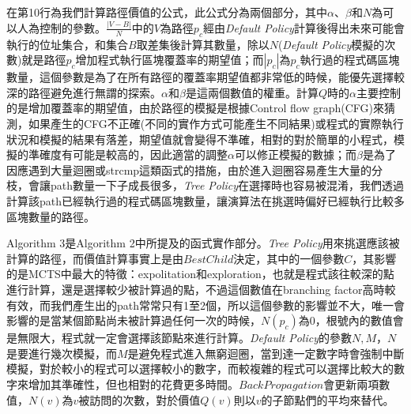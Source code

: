 \documentclass[12pt,a4paper,oneside]{book}
\begin{document}
在第10行為我們計算路徑價值的公式，此公式分為兩個部分，其中$\alpha$、$\beta$和$N$為可以人為控制的參數。$\frac{|V-B|}{N}$中的$V$為路徑$p_c$經由\textit{Default Policy}計算後得出未來可能會執行的位址集合，和集合$B$取差集後計算其數量，除以$N$(\textit{Default Policy}模擬的次數)就是路徑$p_c$增加程式執行區塊覆蓋率的期望值；而$|p_c|$為$p_c$執行過的程式碼區塊數量，這個參數是為了在所有路徑的覆蓋率期望值都非常低的時候，能優先選擇較深的路徑避免進行無謂的探索。$\alpha$和$\beta$是這兩個數值的權重。計算$Q$時的$\alpha$主要控制的是增加覆蓋率的期望值，由於路徑的模擬是根據Control flow graph(CFG)來猜測，如果產生的CFG不正確(不同的實作方式可能產生不同結果)或程式的實際執行狀況和模擬的結果有落差，期望值就會變得不準確，相對的對於簡單的小程式，模擬的準確度有可能是較高的，因此適當的調整$\alpha$可以修正模擬的數據；而$\beta$是為了因應遇到大量迴圈或strcmp這類函式的措施，由於進入迴圈容易產生大量的分枝，會讓path數量一下子成長很多，\textit{Tree Policy}在選擇時也容易被混淆，我們透過計算該path已經執行過的程式碼區塊數量，讓演算法在挑選時偏好已經執行比較多區塊數量的路徑。

Algorithm 3是Algorithm 2中所提及的函式實作部分。\textit{Tree Policy}用來挑選應該被計算的路徑，而價值計算事實上是由$BestChild$決定，其中的一個參數$C$，其影響的是MCTS中最大的特徵：expolitation和exploration，也就是程式該往較深的點進行計算，還是選擇較少被計算過的點，不過這個數值在branching factor高時較有效，而我們產生出的path常常只有1至2個，所以這個參數的影響並不大，唯一會影響的是當某個節點尚未被計算過任何一次的時候，$N(p_c)$為0，根號內的數值會是無限大，程式就一定會選擇該節點來進行計算。\textit{Default Policy}的參數$N,M$，$N$是要進行幾次模擬，而$M$是避免程式進入無窮迴圈，當到達一定數字時會強制中斷模擬，對於較小的程式可以選擇較小的數字，而較複雜的程式可以選擇比較大的數字來增加其準確性，但也相對的花費更多時間。$BackPropagation$會更新兩項數值，$N(v)$為$v$被訪問的次數，對於價值$Q(v)$則以$v$的子節點們的平均來替代。
\end{document}
